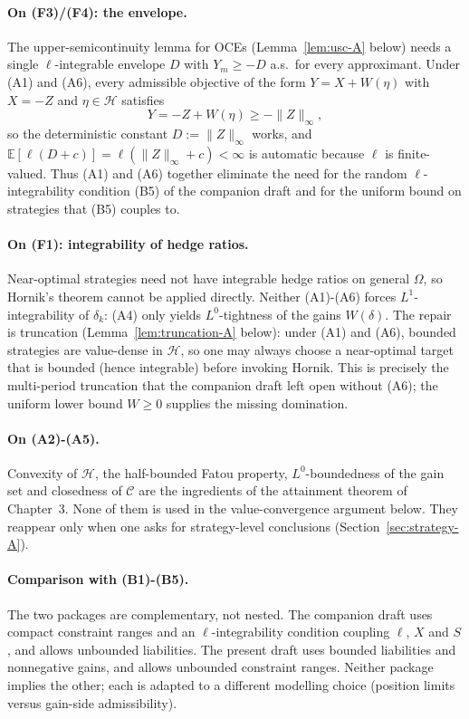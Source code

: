 \documentclass[11pt,a4paper]{report}
\numberwithin{equation}{chapter}
\theoremstyle{plain}
\theoremstyle{definition}
\newcommand{\E}{\mathbb{E}}
\newcommand{\HH}{\mathcal{H}}
\newcommand{\CC}{\mathcal{C}}
\begin{document}
\paragraph{On (F3)/(F4): the envelope.}
The upper-semicontinuity lemma for OCEs (Lemma~\ref{lem:usc-A} below) needs a single $\ell$-integrable envelope $D$ with $Y_m\ge-D$ a.s.\ for every approximant. Under (A1) and (A6), every admissible objective of the form $Y=X+W(\eta)$ with $X=-Z$ and $\eta\in\HH$ satisfies
\[
    Y=-Z+W(\eta)\ge-\|Z\|_\infty,
\]
so the deterministic constant $D:=\|Z\|_\infty$ works, and $\E[\ell(D+c)]=\ell(\|Z\|_\infty+c)<\infty$ is automatic because $\ell$ is finite-valued. Thus (A1) and (A6) together eliminate the need for the random $\ell$-integrability condition (B5) of the companion draft and for the uniform bound on strategies that (B5) couples to.

\paragraph{On (F1): integrability of hedge ratios.}
Near-optimal strategies need not have integrable hedge ratios on general $\Omega$, so Hornik's theorem cannot be applied directly. Neither (A1)-(A6) forces $L^1$-integrability of $\delta_k$: (A4) only yields $L^0$-tightness of the gains $W(\delta)$. The repair is truncation (Lemma~\ref{lem:truncation-A} below): under (A1) and (A6), bounded strategies are value-dense in $\HH$, so one may always choose a near-optimal target that is bounded (hence integrable) before invoking Hornik. This is precisely the multi-period truncation that the companion draft left open without (A6); the uniform lower bound $W\ge0$ supplies the missing domination.

\paragraph{On (A2)-(A5).}
Convexity of $\HH$, the half-bounded Fatou property, $L^0$-boundedness of the gain set and closedness of $\CC$ are the ingredients of the attainment theorem of Chapter~3. None of them is used in the value-convergence argument below. They reappear only when one asks for strategy-level conclusions (Section~\ref{sec:strategy-A}).

\paragraph{Comparison with (B1)-(B5).}
The two packages are complementary, not nested. The companion draft uses compact constraint ranges and an $\ell$-integrability condition coupling $\ell$, $X$ and $S$, and allows unbounded liabilities. The present draft uses bounded liabilities and nonnegative gains, and allows unbounded constraint ranges. Neither package implies the other; each is adapted to a different modelling choice (position limits versus gain-side admissibility).
\end{document}
